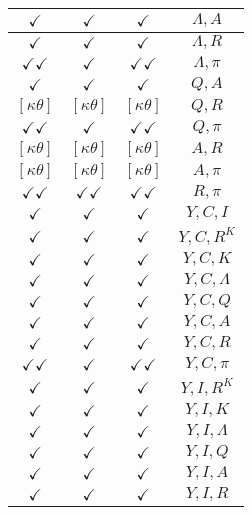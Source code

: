 \documentclass[a4paper,10pt]{article}
\begin{document}
\begin{longtable}{|c|c|c|c|}
\hline
$\checkmark$ & $\checkmark$ & $\checkmark$ & ${\Lambda},{A}$ \\
\hline
$\checkmark$ & $\checkmark$ & $\checkmark$ & ${\Lambda},{R}$ \\
\hline
$\checkmark\checkmark$ & $\checkmark$ & $\checkmark\checkmark$ & ${\Lambda},{\pi}$ \\
\hline
$\checkmark$ & $\checkmark$ & $\checkmark$ & ${Q},{A}$ \\
\hline
$[\kappa \theta ]$ & $[\kappa \theta ]$ & $[\kappa \theta ]$ & ${Q},{R}$ \\
\hline
$\checkmark\checkmark$ & $\checkmark$ & $\checkmark\checkmark$ & ${Q},{\pi}$ \\
\hline
$[\kappa \theta ]$ & $[\kappa \theta ]$ & $[\kappa \theta ]$ & ${A},{R}$ \\
\hline
$[\kappa \theta ]$ & $[\kappa \theta ]$ & $[\kappa \theta ]$ & ${A},{\pi}$ \\
\hline
$\checkmark\checkmark$ & $\checkmark\checkmark$ & $\checkmark\checkmark$ & ${R},{\pi}$ \\
\hline
$\checkmark$ & $\checkmark$ & $\checkmark$ & ${Y},{C},{I}$ \\
\hline
$\checkmark$ & $\checkmark$ & $\checkmark$ & ${Y},{C},{R^{K}}$ \\
\hline
$\checkmark$ & $\checkmark$ & $\checkmark$ & ${Y},{C},{K}$ \\
\hline
$\checkmark$ & $\checkmark$ & $\checkmark$ & ${Y},{C},{\Lambda}$ \\
\hline
$\checkmark$ & $\checkmark$ & $\checkmark$ & ${Y},{C},{Q}$ \\
\hline
$\checkmark$ & $\checkmark$ & $\checkmark$ & ${Y},{C},{A}$ \\
\hline
$\checkmark$ & $\checkmark$ & $\checkmark$ & ${Y},{C},{R}$ \\
\hline
$\checkmark\checkmark$ & $\checkmark$ & $\checkmark\checkmark$ & ${Y},{C},{\pi}$ \\
\hline
$\checkmark$ & $\checkmark$ & $\checkmark$ & ${Y},{I},{R^{K}}$ \\
\hline
$\checkmark$ & $\checkmark$ & $\checkmark$ & ${Y},{I},{K}$ \\
\hline
$\checkmark$ & $\checkmark$ & $\checkmark$ & ${Y},{I},{\Lambda}$ \\
\hline
$\checkmark$ & $\checkmark$ & $\checkmark$ & ${Y},{I},{Q}$ \\
\hline
$\checkmark$ & $\checkmark$ & $\checkmark$ & ${Y},{I},{A}$ \\
\hline
$\checkmark$ & $\checkmark$ & $\checkmark$ & ${Y},{I},{R}$ \\

\end{longtable}
\end{document}
